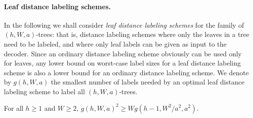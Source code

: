 \paragraph{Leaf distance labeling schemes.}
In the following we shall consider \emph{leaf distance labeling schemes} for the family of $(h,W,a)$-trees: that is, distance labeling schemes where only the leaves in a tree need to be labeled, and where only leaf labels can be given as input to the decoder. Since an ordinary distance labeling scheme obviously can be used only for leaves, any lower bound on worst-case label sizes for a leaf distance labeling scheme is also a lower bound for an ordinary distance labeling scheme. We denote by $g(h,W,a)$ the smallest number of labels needed by an optimal leaf distance labeling scheme to label all $(h,W,a)$-trees.
\begin{lemma} \label{lemm:distancehM}
For all $h\geq 1$ and $W\geq 2$, $g(h,W,a)^2\geq Wg(h-1,W^2/a^2,a^2)$.
\end{lemma}
